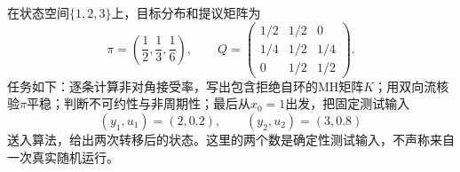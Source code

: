 \label{struct:V5-C03-CH32}
\begin{example}[由非对称提议构造完整MH核]\label{exm:V5-C03-three-state-kernel}
在状态空间$\{1,2,3\}$上，目标分布和提议矩阵为
\[
\pi=\left(\frac12,\frac13,\frac16\right),
\qquad
Q=\begin{pmatrix}
1/2&1/2&0\\
1/4&1/2&1/4\\
0&1/2&1/2
\end{pmatrix}.
\]
任务如下：逐条计算非对角接受率，写出包含拒绝自环的MH矩阵$K$；用双向流核验$\pi$平稳；判断不可约性与非周期性；最后从$x_0=1$出发，把固定测试输入
\[
(y_1,u_1)=(2,0.2),\qquad (y_2,u_2)=(3,0.8)
\]
送入算法，给出两次转移后的状态。这里的两个数是确定性测试输入，不声称来自一次真实随机运行。
\end{example}


